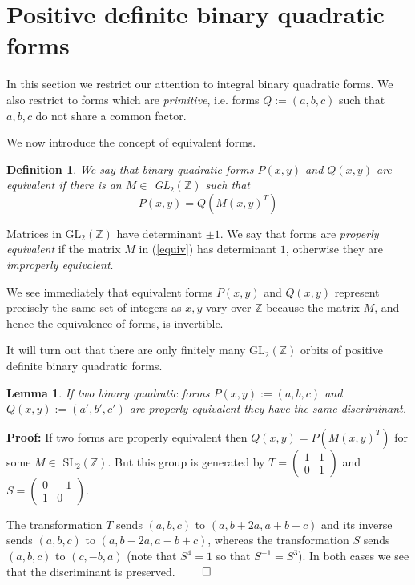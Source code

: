 \documentclass[a4paper,10pt]{amsart}
\newtheorem{lemma}[theorem]{Lemma}
\newtheorem{definition}[theorem]{Definition}
\begin{document}
\section{Positive definite binary quadratic forms}

In this section we restrict our attention to integral binary quadratic forms. We also restrict to forms which are \emph{primitive}, i.e. forms $Q := (a, b, c)$ such that $a, b, c$ do not share a common factor.

We now introduce the concept of equivalent forms.

\begin{definition}
We say that binary quadratic forms $P(x, y)$ and $Q(x, y)$ are \emph{equivalent} if there is an $M \in$ GL$_2(\mathbb{Z})$ such that 
\begin{equation}\label{equiv}
P(x, y) = Q(M(x, y)^T)
\end{equation}
\end{definition}

Matrices in GL$_2(\mathbb{Z})$ have determinant $\pm 1$. We say that forms are \emph{properly equivalent} if the matrix $M$ in (\ref{equiv}) has determinant $1$, otherwise they are \emph{improperly equivalent}.

We see immediately that equivalent forms $P(x, y)$ and $Q(x, y)$ represent precisely the same set of integers as $x, y$ vary over $\mathbb{Z}$ because the matrix $M$, and hence the equivalence of forms, is invertible.

It will turn out that there are only finitely many GL$_2(\mathbb{Z})$ orbits of positive definite binary quadratic forms. 

\begin{lemma}
If two binary quadratic forms $P(x, y) := (a, b, c)$ and $Q(x, y) := (a', b', c')$ are properly equivalent they have the same discriminant.
\end{lemma}

\textbf{Proof:} 
If two forms are properly equivalent then $Q(x, y) = P(M(x, y)^T)$ for some $M \in$ SL$_2(\mathbb{Z})$. But this group is generated by $T = \left(\begin{array}{cc}1 & 1 \\ 0 & 1 \end{array}\right)$ and $S = \left(\begin{array}{cc}0 & -1 \\ 1 & 0 \end{array}\right)$.

The transformation $T$ sends $(a, b, c)$ to $(a, b + 2a, a + b + c)$ and its inverse sends $(a, b, c)$ to $(a, b - 2a, a - b + c)$, whereas the transformation $S$ sends $(a, b, c)$ to $(c, -b, a)$ (note that $S^4 = 1$ so that $S^{-1} = S^3$). In both cases we see that the discriminant is preserved. $\qed$
\end{document}
